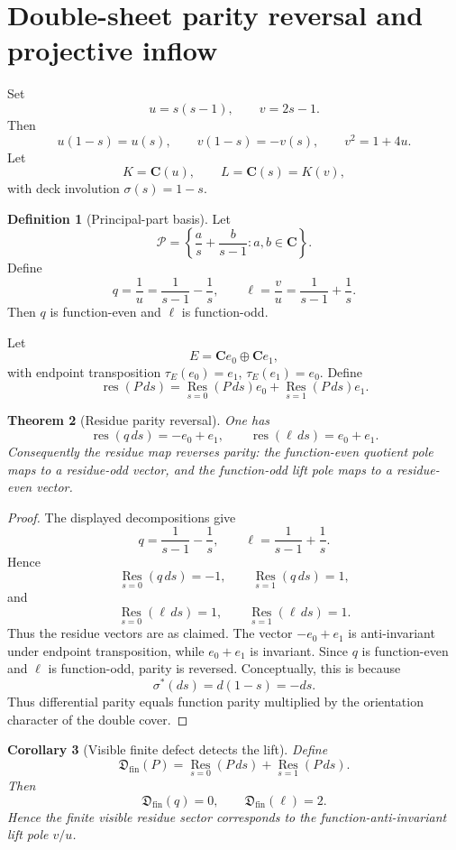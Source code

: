 \documentclass[11pt]{article}
\newcommand{\C}{\mathbf C}
\newcommand{\Res}{\operatorname*{Res}}
\theoremstyle{plain}
\newtheorem{theorem}{Theorem}[section]
\newtheorem{corollary}[theorem]{Corollary}
\theoremstyle{definition}
\newtheorem{definition}[theorem]{Definition}
\begin{document}
\section{Double-sheet parity reversal and projective inflow}

Set
\[
   u=s(s-1),\qquad v=2s-1.
\]
Then
\[
   u(1-s)=u(s),\qquad v(1-s)=-v(s),\qquad v^2=1+4u.
\]
Let
\[
   K=\C(u),\qquad L=\C(s)=K(v),
\]
with deck involution \(\sigma(s)=1-s\).

\begin{definition}[Principal-part basis]\label{def:principal-basis}
Let
\[
   \mathcal P=\left\{\frac a s+\frac b{s-1}:a,b\in\C\right\}.
\]
Define
\[
   q=\frac1u=\frac1{s-1}-\frac1s,
   \qquad
   \ell=\frac vu=\frac1{s-1}+\frac1s.
\]
Then \(q\) is function-even and \(\ell\) is function-odd.
\end{definition}

Let
\[
   E=\C e_0\oplus\C e_1,
\]
with endpoint transposition \(\tau_E(e_0)=e_1\), \(\tau_E(e_1)=e_0\).  Define
\[
   \operatorname{res}(P\,ds)=\Res_{s=0}(P\,ds)e_0+\Res_{s=1}(P\,ds)e_1.
\]

\begin{theorem}[Residue parity reversal]\label{thm:residue-reversal}
One has
\[
   \operatorname{res}(q\,ds)=-e_0+e_1,
   \qquad
   \operatorname{res}(\ell\,ds)=e_0+e_1.
\]
Consequently the residue map reverses parity: the function-even quotient pole maps to a residue-odd vector, and the function-odd lift pole maps to a residue-even vector.
\end{theorem}

\begin{proof}
The displayed decompositions give
\[
   q=\frac1{s-1}-\frac1s,
   \qquad
   \ell=\frac1{s-1}+\frac1s.
\]
Hence
\[
   \Res_{s=0}(q\,ds)=-1,
   \qquad
   \Res_{s=1}(q\,ds)=1,
\]
and
\[
   \Res_{s=0}(\ell\,ds)=1,
   \qquad
   \Res_{s=1}(\ell\,ds)=1.
\]
Thus the residue vectors are as claimed.  The vector \(-e_0+e_1\) is anti-invariant under endpoint transposition, while \(e_0+e_1\) is invariant.  Since \(q\) is function-even and \(\ell\) is function-odd, parity is reversed.  Conceptually, this is because
\[
   \sigma^*(ds)=d(1-s)=-ds.
\]
Thus differential parity equals function parity multiplied by the orientation character of the double cover.
\end{proof}

\begin{corollary}[Visible finite defect detects the lift]\label{cor:visible-detects-lift}
Define
\[
   \mathfrak D_{\operatorname{fin}}(P)=\Res_{s=0}(P\,ds)+\Res_{s=1}(P\,ds).
\]
Then
\[
   \mathfrak D_{\operatorname{fin}}(q)=0,
   \qquad
   \mathfrak D_{\operatorname{fin}}(\ell)=2.
\]
Hence the finite visible residue sector corresponds to the function-anti-invariant lift pole \(v/u\).
\end{corollary}
\end{document}
